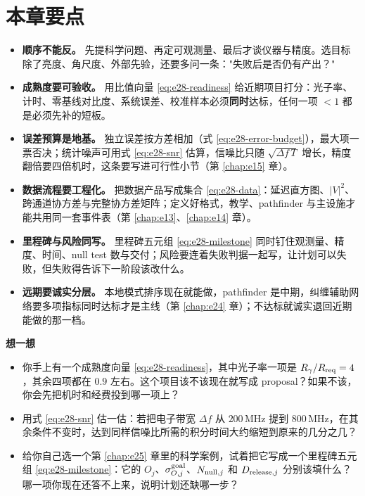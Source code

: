 \section*{本章要点}

\begin{itemize}
  \item \textbf{顺序不能反。} 先提科学问题、再定可观测量、最后才谈仪器与精度。选目标除了亮度、角尺度、外部先验，还要多问一条："失败后是否仍有产出？"
  \item \textbf{成熟度要可验收。} 用比值向量 \eqref{eq:e28-readiness} 给近期项目打分：光子率、计时、零基线对比度、系统误差、校准样本必须\textbf{同时}达标，任何一项 \(<1\) 都是必须先补的短板。
  \item \textbf{误差预算是地基。} 独立误差按方差相加（式 \eqref{eq:e28-error-budget}），最大项一票否决；统计噪声可用式 \eqref{eq:e28-snr} 估算，信噪比只随 \(\sqrt{\Delta f\,T}\) 增长，精度翻倍要四倍机时，这条要写进可行性小节（第 \ref{chap:e15} 章）。
  \item \textbf{数据流程要工程化。} 把数据产品写成集合 \eqref{eq:e28-data}：延迟直方图、\(|V|^2\)、跨通道协方差与完整协方差矩阵；定义好格式，教学、pathfinder 与主设施才能共用同一套事件表（第 \ref{chap:e13}、\ref{chap:e14} 章）。
  \item \textbf{里程碑与风险同写。} 里程碑五元组 \eqref{eq:e28-milestone} 同时钉住观测量、精度、时间、null test 数与交付；风险要连着失败判据一起写，让计划可以失败，但失败得告诉下一阶段该改什么。
  \item \textbf{远期要诚实分层。} 本地模式排序现在就能做，pathfinder 是中期，纠缠辅助网络要多项指标同时达标才是主线（第 \ref{chap:e24} 章）；不达标就诚实退回近期能做的那一档。
\end{itemize}

\medskip
\noindent\textbf{想一想}
\begin{itemize}
  \item 你手上有一个成熟度向量 \eqref{eq:e28-readiness}，其中光子率一项是 \(R_\gamma/R_{\rm req}=4\)，其余四项都在 \(0.9\) 左右。这个项目该不该现在就写成 proposal？如果不该，你会先把机时和经费投到哪一项上？
  \item 用式 \eqref{eq:e28-snr} 估一估：若把电子带宽 \(\Delta f\) 从 \(200\,\mathrm{MHz}\) 提到 \(800\,\mathrm{MHz}\)，在其余条件不变时，达到同样信噪比所需的积分时间大约缩短到原来的几分之几？
  \item 给你自己选一个第 \ref{chap:e25} 章里的科学案例，试着把它写成一个里程碑五元组 \eqref{eq:e28-milestone}：它的 \(O_j\)、\(\sigma_{O,j}^{\rm goal}\)、\(N_{{\rm null},j}\) 和 \(D_{{\rm release},j}\) 分别该填什么？哪一项你现在还答不上来，说明计划还缺哪一步？
\end{itemize}
